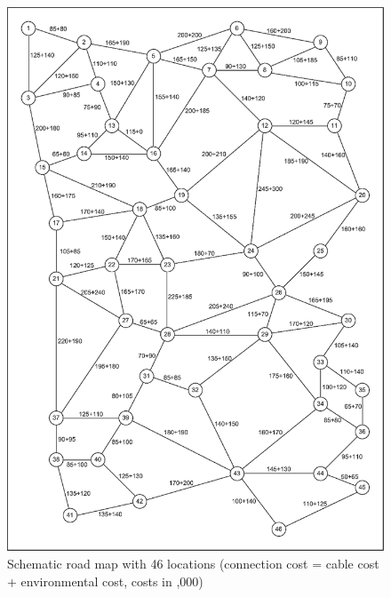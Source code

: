 \begin{figure}[H]
	\centering
	\includegraphics[scale=0.5]{./img/graph2-2.png}
	\caption{Schematic road map with 46 locations (connection cost = cable cost + environmental cost, costs in ,000)}
	\label{graph2-2}
\end{figure}

